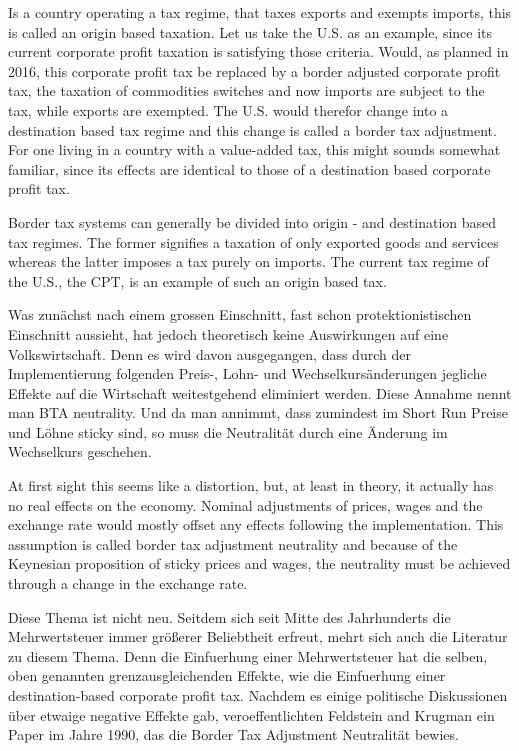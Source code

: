 Is a country operating a tax regime, that taxes exports and exempts imports, this is called an origin based taxation. Let us take the U.S. as an example, since its current corporate profit taxation is satisfying those criteria. Would, as planned in 2016, this corporate profit tax be replaced by a border adjusted corporate profit tax, the taxation of commodities switches and now imports are subject to the tax, while exports are exempted. The U.S. would therefor change into a destination based tax regime and this change is called a border tax adjustment. For one living in a country with a value-added tax, this might sounds somewhat familiar, since its effects are identical to those of a destination based corporate profit tax. 

Border tax systems can generally be divided into origin - and destination based tax regimes. The former signifies a taxation of only exported goods and services whereas the latter imposes a tax purely on imports. The current tax regime of the U.S., the CPT, is an example of such an origin based tax. 

Was zunächst nach einem grossen Einschnitt, fast schon protektionistischen Einschnitt aussieht, hat jedoch theoretisch keine Auswirkungen auf eine Volkswirtschaft. Denn es wird davon ausgegangen, dass durch der Implementierung folgenden Preis-, Lohn- und Wechselkursänderungen jegliche Effekte auf die Wirtschaft weitestgehend eliminiert werden. Diese Annahme nennt man BTA neutrality. Und da man annimmt, dass zumindest im Short Run Preise und Löhne sticky sind, so muss die Neutralität durch eine Änderung im Wechselkurs geschehen. 


At first sight this seems like a distortion, but, at least in theory, it actually has no real effects on the economy. Nominal adjustments of prices, wages and the exchange rate would mostly offset any effects following the implementation. This assumption is called border tax adjustment neutrality and because of the Keynesian proposition of sticky prices and wages, the neutrality must be achieved through a change in the exchange rate.

Diese Thema ist nicht neu. Seitdem sich seit Mitte des Jahrhunderts die Mehrwertsteuer immer größerer Beliebtheit erfreut, mehrt sich auch die Literatur zu diesem Thema. Denn die Einfuerhung einer Mehrwertsteuer hat die selben, oben genannten grenzausgleichenden Effekte, wie die Einfuerhung einer destination-based corporate profit tax. Nachdem es einige politische Diskussionen über etwaige negative Effekte gab, veroeffentlichten Feldstein and Krugman ein Paper im Jahre 1990, das die Border Tax Adjustment Neutralität bewies. 


